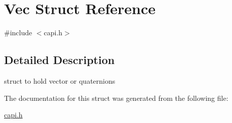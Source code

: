 \hypertarget{structVec}{}\section{Vec Struct Reference}
\label{structVec}


{\ttfamily \#include $<$capi.\+h$>$}



\subsection{Detailed Description}
struct to hold vector or quaternions 

The documentation for this struct was generated from the following file\+:\begin{DoxyCompactItemize}
\item 
\mbox{\hyperlink{capi_8h}{capi.\+h}}\end{DoxyCompactItemize}
